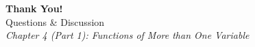 \documentclass[aspectratio=169,10pt]{beamer}
\begin{document}
\begin{frame}[plain]
  \begin{center}
    \vspace{2cm}
    {\Huge \bfseries \color{primaryblue} Thank You!}\\[1em]
    {\large Questions \& Discussion}\\[1.5em]
    \textit{Chapter 4 (Part 1): Functions of More than One Variable}
  \end{center}
\end{frame}
\end{document}
